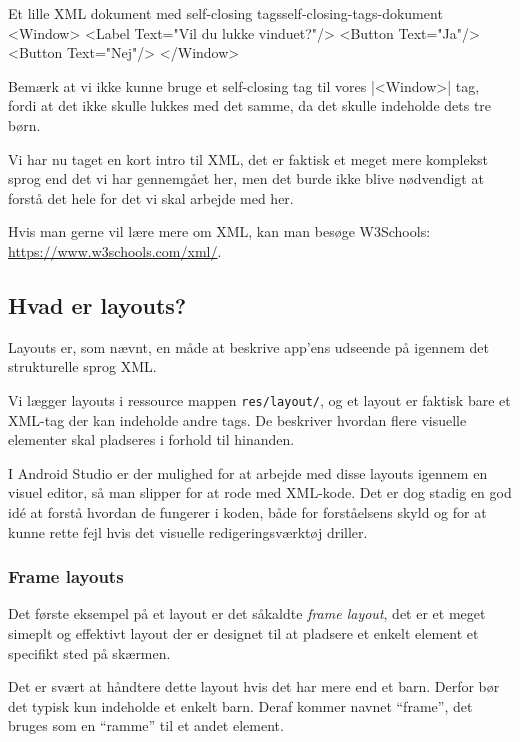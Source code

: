 \begin{example}
	\begin{XmlCode}{Et lille XML dokument med self-closing tags}{self-closing-tags-dokument}
		<Window>
			<Label Text="Vil du lukke vinduet?"/>
			<Button Text="Ja"/>
			<Button Text="Nej"/>
		</Window>
	\end{XmlCode}
\end{example}

\begin{remark}
	Bemærk at vi ikke kunne bruge et self-closing tag til vores \XmlInline|<Window>| tag, fordi at det ikke skulle lukkes med det samme, da det skulle indeholde dets tre børn.
\end{remark}

Vi har nu taget en kort intro til XML, det er faktisk et meget mere komplekst sprog end det vi har gennemgået her, men det burde ikke blive nødvendigt at forstå det hele for det vi skal arbejde med her.

Hvis man gerne vil lære mere om XML, kan man besøge W3Schools: \url{https://www.w3schools.com/xml/}.


\subsection{Hvad er layouts?}
Layouts er, som nævnt, en måde at beskrive app'ens udseende på igennem det strukturelle sprog XML.

Vi lægger layouts i ressource mappen \texttt{res/layout/}, og et layout er 
faktisk bare et XML-tag der kan indeholde andre tags. De beskriver hvordan 
flere visuelle elementer skal pladseres i forhold til hinanden.

I Android Studio er der mulighed for at arbejde med disse layouts igennem en 
visuel editor, så man slipper for at rode med XML-kode. Det er dog stadig en 
god idé at forstå hvordan de fungerer i koden, både for forståelsens skyld og 
for at kunne rette fejl hvis det visuelle redigeringsværktøj driller.

\subsubsection{Frame layouts}

Det første eksempel på et layout er det såkaldte \textit{frame layout}, det er et meget simeplt og effektivt layout der er designet til at pladsere et enkelt element et specifikt sted på skærmen.

Det er svært at håndtere dette layout hvis det har mere end et barn. Derfor bør 
det typisk kun indeholde et enkelt barn. Deraf kommer navnet ``frame'', det 
bruges som en ``ramme'' til et andet element.


